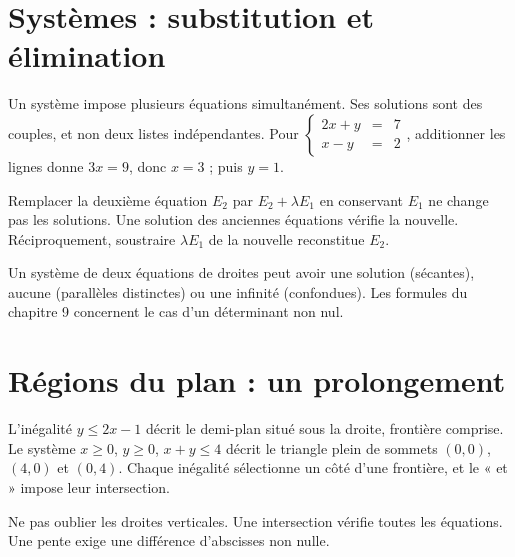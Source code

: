 \documentclass[../cours_2de.tex]{subfiles}
\begin{document}
\section{Systèmes : substitution et élimination}
Un système impose plusieurs équations simultanément. Ses solutions sont des couples, et non deux listes indépendantes.
Pour
$\left\{\begin{array}{rcl}2x+y&=&7\\x-y&=&2\end{array}\right.$,
additionner les lignes donne $3x=9$, donc $x=3$ ; puis $y=1$.
\begin{demonstration}
Remplacer la deuxième équation $E_2$ par $E_2+\lambda E_1$ en conservant $E_1$ ne change pas les solutions. Une solution des anciennes équations vérifie la nouvelle. Réciproquement, soustraire $\lambda E_1$ de la nouvelle reconstitue $E_2$.
\end{demonstration}
Un système de deux équations de droites peut avoir une solution (sécantes), aucune (parallèles distinctes) ou une infinité (confondues). Les formules du chapitre 9 concernent le cas d'un déterminant non nul.
\section{Régions du plan : un prolongement}
\approfondissement L'inégalité $y\leq2x-1$ décrit le demi-plan situé sous la droite, frontière comprise. Le système $x\geq0$, $y\geq0$, $x+y\leq4$ décrit le triangle plein de sommets $(0,0)$, $(4,0)$ et $(0,4)$.
Chaque inégalité sélectionne un côté d'une frontière, et le « et » impose leur intersection.
\begin{retenir}
Ne pas oublier les droites verticales. Une intersection vérifie toutes les équations. Une pente exige une différence d'abscisses non nulle.
\end{retenir}
\end{document}
